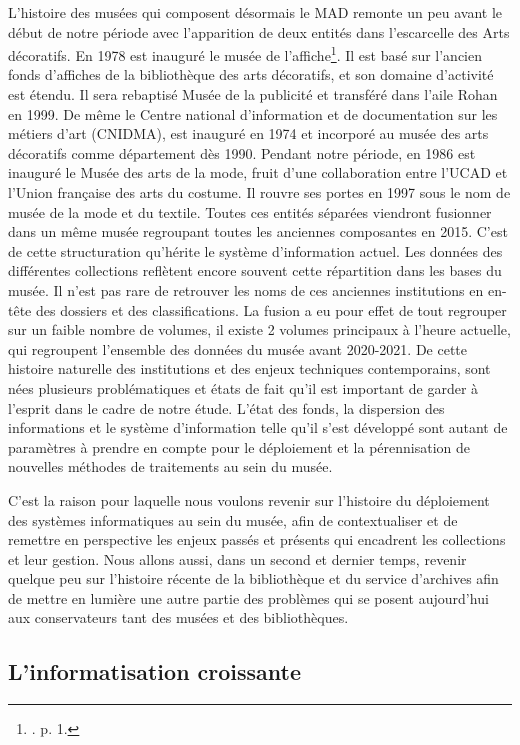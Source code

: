 L'histoire des musées qui composent désormais le MAD remonte un peu avant le début de notre période avec l'apparition de deux entités dans l'escarcelle des Arts décoratifs. En 1978 est inauguré le musée de l'affiche\footnote{\cite{siguret_ir_2001}. p. 1.}. Il est basé sur l'ancien fonds d'affiches de la bibliothèque des arts décoratifs, et son domaine d'activité est étendu. Il sera rebaptisé Musée de la publicité et transféré dans l'aile Rohan en 1999. De même le Centre national d'information et de documentation sur les métiers d'art (CNIDMA), est inauguré en 1974 et incorporé au musée des arts décoratifs comme département dès 1990. Pendant notre période, en 1986 est inauguré le Musée des arts de la mode, fruit d'une collaboration entre l'UCAD et l'Union française des arts du costume. Il rouvre ses portes en 1997 sous le nom de musée de la mode et du textile. Toutes ces entités séparées viendront fusionner dans un même musée regroupant toutes les anciennes composantes en 2015. C'est de cette structuration qu'hérite le système d'information actuel. Les données des différentes collections reflètent encore souvent cette répartition dans les bases du musée. Il n'est pas rare de retrouver les noms de ces anciennes institutions en en-tête des dossiers et des classifications. La fusion a eu pour effet de tout regrouper sur un faible nombre de volumes, il existe 2 volumes principaux à l'heure actuelle, qui regroupent l'ensemble des données du musée avant 2020-2021. De cette histoire naturelle des institutions et des enjeux techniques contemporains, sont nées plusieurs problématiques et états de fait qu'il est important de garder à l'esprit dans le cadre de notre étude. L'état des fonds, la dispersion des informations et le système d'information telle qu'il s'est développé sont autant de paramètres à prendre en compte pour le déploiement et la pérennisation de nouvelles méthodes de traitements au sein du musée. 

C'est la raison pour laquelle nous voulons revenir sur l'histoire du déploiement des systèmes informatiques au sein du musée, afin de contextualiser et de remettre en perspective les enjeux passés et présents qui encadrent les collections et leur gestion. Nous allons aussi, dans un second et dernier temps, revenir quelque peu sur l'histoire récente de la bibliothèque et du service d'archives afin de mettre en lumière une autre partie des problèmes qui se posent aujourd'hui aux conservateurs tant des musées et des bibliothèques. 

\subsection{L'informatisation croissante}

